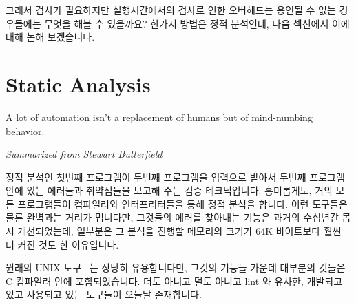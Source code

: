 그래서 검사가 필요하지만 실행시간에서의 검사로 인한 오버헤드는 용인될 수 없는
경우들에는 무엇을 해볼 수 있을까요?
한가지 방법은 정적 분석인데, 다음 섹션에서 이에 대해 논해 보겠습니다.

\section{Static Analysis}
\label{sec:debugging:Static Analysis}
%
\epigraph{A lot of automation isn't a replacement of
	  humans but of mind-numbing behavior.}
	 {\emph{Summarized from Stewart Butterfield}}

정적 분석인 첫번째 프로그램이 두번째 프로그램을 입력으로 받아서 두번째 프로그램
안에 있는 에러들과 취약점들을 보고해 주는 검증 테크닉입니다.
흥미롭게도, 거의 모든 프로그램들이 컴파일러와 인터프리터들을 통해 정적 분석을
합니다.
이런 도구들은 물론 완벽과는 거리가 멉니다만, 그것들의 에러를 찾아내는 기능은
과거의 수십년간 몹시 개선되었는데, 일부분은 그 분석을 진행할 메모리의 크기가
64K 바이트보다 훨씬 더 커진 것도 한 이유입니다.

원래의 UNIX  도구~\cite{StephenJohnson1977lint} 는 상당히
유용합니다만, 그것의 기능들 가운데 대부분의 것들은 C 컴파일러 안에
포함되었습니다.
더도 아니고 덜도 아니고 lint 와 유사한, 개발되고 있고 사용되고 있는 도구들이
오늘날 존재합니다.


